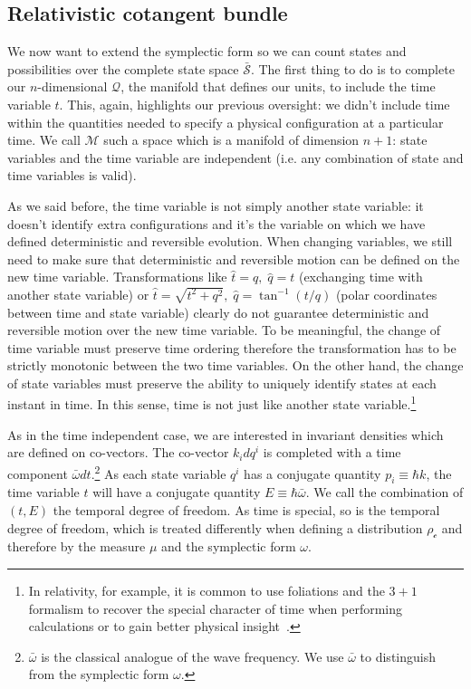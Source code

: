 \documentclass[smallextended]{svjour3}
\numberwithin{equation}{section}
\theoremstyle{definition}
\begin{document}
\subsection{Relativistic cotangent bundle}

We now want to extend the symplectic form so we can count states and possibilities over the complete state space $\bar{\mathcal{S}}$. The first thing to do is to complete our $n$-dimensional $\mathcal{Q}$, the manifold that defines our units, to include the time variable $t$. This, again, highlights our previous oversight: we didn't include time within the quantities needed to specify a physical configuration at a particular time. We call $\mathcal{M}$ such a space which is a manifold of dimension $n+1$: state variables and the time variable are independent (i.e. any combination of state and time variables is valid).

As we said before, the time variable is not simply another state variable: it doesn't identify extra configurations and it's the variable on which we have defined deterministic and reversible evolution. When changing variables, we still need to make sure that deterministic and reversible motion can be defined on the new time variable. Transformations like $\hat{t}=q, \; \hat{q}=t$ (exchanging time with another state variable) or $\hat{t}=\sqrt{t^2 + q^2}, \; \hat{q}=\tan^{-1}(t/q)$ (polar coordinates between time and state variable) clearly do not guarantee deterministic and reversible motion over the new time variable. To be meaningful, the change of time variable must preserve time ordering therefore the transformation has to be strictly monotonic between the two time variables. On the other hand, the change of state variables must preserve the ability to uniquely identify states at each instant in time. In this sense, time is not just like another state variable.\footnote{In relativity, for example, it is common to use foliations and the $3+1$ formalism to recover the special character of time when performing calculations or to gain better physical insight~\cite{Gourgoulhon}.}

As in the time independent case, we are interested in invariant densities which are defined on co-vectors. The co-vector $k_i dq^i$ is completed with a time component $\bar{\omega} dt$.\footnote{$\bar{\omega}$ is the classical analogue of the wave frequency. We use $\bar{\omega}$ to distinguish from the symplectic form $\omega$.} As each state variable $q^i$ has a conjugate quantity $p_i\equiv \hbar k$, the time variable $t$ will have a conjugate quantity $E\equiv\hbar\bar{\omega}$. We call the combination of $(t, E)$ the temporal degree of freedom. As time is special, so is the temporal degree of freedom, which is treated differently when defining a distribution $\rho_\mathcal{c}$ and therefore by the measure $\mu$ and the symplectic form $\omega$.
\end{document}
